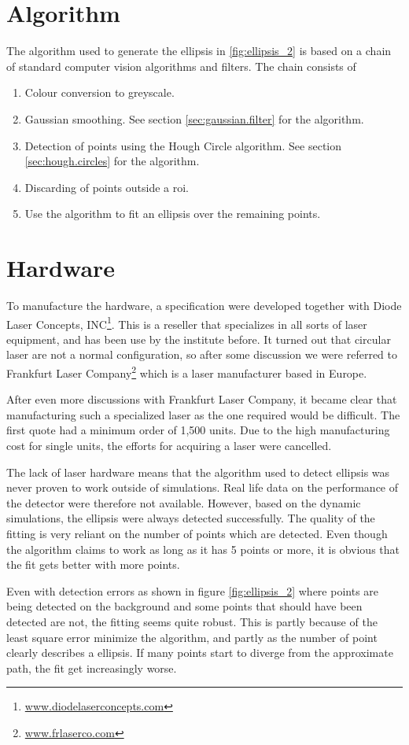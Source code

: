 \section{Algorithm}
The algorithm used to generate the ellipsis in \vref{fig:ellipsis_2} is based on a chain of standard 
computer vision algorithms and filters. The chain consists of

\begin{enumerate}
	\item Colour conversion to greyscale.
	\item Gaussian smoothing. See section \vref{sec:gaussian.filter} for the algorithm.
	\item Detection of points using the Hough Circle algorithm. See section \vref{sec:hough.circles} for the algorithm.
	\item Discarding of points outside a \gls{roi}.
	\item Use the \citet{fitzgibbon95} algorithm to fit an ellipsis over the remaining points.
\end{enumerate}

\section{Hardware}
To manufacture the hardware, a specification were developed together with Diode Laser Concepts, INC\footnote{\url{www.diodelaserconcepts.com}}. This is a reseller that 
specializes in all sorts of laser equipment, and has been use by the institute before. It turned out that circular laser 
are not a normal configuration, so after some discussion we were referred to Frankfurt Laser Company\footnote{\url{www.frlaserco.com}} which 
is a laser manufacturer based in Europe.

After even more discussions with Frankfurt Laser Company, it became clear that manufacturing such a specialized laser as the one 
required would be difficult. The first quote had a minimum order of 1,500 units. Due to the high manufacturing cost for single 
units, the efforts for acquiring a laser were cancelled.

The lack of laser hardware means that the algorithm used to detect ellipsis was never proven to work outside of simulations. Real life 
data on the performance of the detector were therefore not available. However, based on the dynamic simulations, the ellipsis were always 
detected successfully. The quality of the fitting is very reliant on the number of points which are detected. Even though the 
algorithm claims to work as long as it has 5 points or more, it is obvious that the fit gets better with more points.

Even with detection errors as shown in figure \vref{fig:ellipsis_2} where points are being detected on the background and some points that should 
have been detected are not, the fitting seems quite robust. This is partly because of the least square error minimize the \citet{fitzgibbon95} algorithm, 
and partly as the number of point clearly describes a ellipsis. If many points start to diverge from the approximate path, the fit get increasingly worse.

